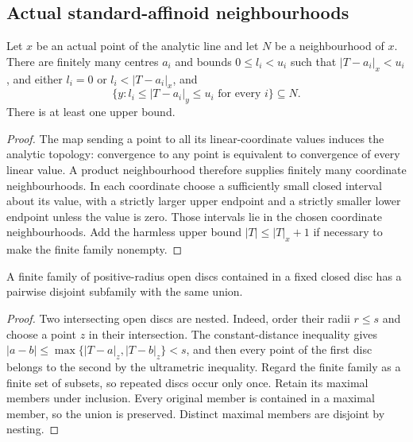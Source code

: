 \subsection{Actual standard-affinoid neighbourhoods}\label{subsec:fc-line-affinoid-basis}

\begin{lemma}\label{lem:fc-finite-linear-box}
\leanok
{}
Let $x$ be an actual point of the analytic line and let $N$ be a neighbourhood
of $x$. There are finitely many centres $a_i$ and bounds $0\le l_i<u_i$
such that $|T-a_i|_x<u_i$, and either $l_i=0$ or $l_i<|T-a_i|_x$, and
\[
 \{y: l_i\le |T-a_i|_y\le u_i\text{ for every }i\}\subseteq N.
\]
There is at least one upper bound.
\end{lemma}

\begin{proof}
The map sending a point to all its linear-coordinate values induces the
analytic topology: convergence to any point is equivalent to convergence of
every linear value. A product neighbourhood therefore supplies finitely many
coordinate neighbourhoods. In each coordinate choose a sufficiently small
closed interval about its value, with a strictly larger upper endpoint and a
strictly smaller lower endpoint unless the value is zero. Those intervals lie
in the chosen coordinate neighbourhoods. Add the harmless upper bound
$|T|\le |T|_x+1$ if necessary to make the finite family nonempty.
\end{proof}

\begin{lemma}\label{lem:fc-finite-hole-pruning}
\leanok
{}
A finite family of positive-radius open discs contained in a fixed closed
disc has a pairwise disjoint subfamily with the same union.
\end{lemma}

\begin{proof}
Two intersecting open discs are nested. Indeed, order their radii $r\le s$
and choose a point $z$ in their intersection. The constant-distance inequality
gives $|a-b|\le\max\{|T-a|_z,|T-b|_z\}<s$, and then every point of the
first disc belongs to the second by the ultrametric inequality. Regard the
finite family as a finite set of subsets, so repeated discs occur only once.
Retain its maximal members under inclusion. Every original member is contained
in a maximal member, so the union is preserved. Distinct maximal members are
disjoint by nesting.
\end{proof}

